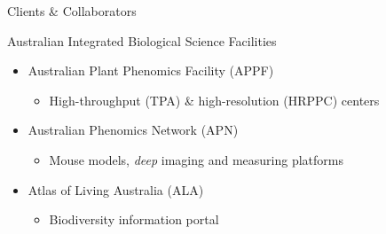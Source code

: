 \documentclass[ignorenonframetext,compress]{beamer}
\begin{document}
\begin{frame}{Clients \& Collaborators}
\begin{block}{Australian Integrated Biological Science Facilities}
    \begin{itemize}
        \item<2-> Australian Plant Phenomics Facility (APPF)
            \begin{itemize}
                \item High-throughput (TPA) \& high-resolution (HRPPC) centers
            \end{itemize}
        \item<3-> Australian Phenomics Network (APN)
            \begin{itemize}
                \item Mouse models, \emph{deep} imaging and measuring platforms
            \end{itemize}
        \item<4-> Atlas of Living Australia (ALA)
            \begin{itemize}
                \item Biodiversity information portal
            \end{itemize}
    \end{itemize}
\end{block}
~\\
\begin{figure}[ht]
\centering
{}
\end{figure}
\end{frame}
\end{document}
